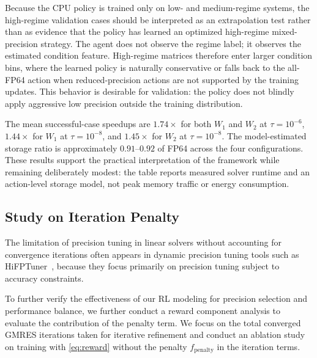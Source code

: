 \documentclass[Afour,sageh,times]{sagej}
\theoremstyle{plain}
\theoremstyle{definition}
\begin{document}
{Because the CPU policy is trained only on low- and medium-regime systems, the high-regime validation cases should be interpreted as an extrapolation test rather than as evidence that the policy has learned an optimized high-regime mixed-precision strategy. The agent does not observe the regime label; it observes the estimated condition feature. High-regime matrices therefore enter larger condition bins, where the learned policy is naturally conservative or falls back to the all-FP64 action when reduced-precision actions are not supported by the training updates. This behavior is desirable for validation: the policy does not blindly apply aggressive low precision outside the training distribution.

The mean successful-case speedups are $1.74\times$ for both $W_1$ and $W_2$ at $\tau=10^{-6}$, $1.44\times$ for $W_1$ at $\tau=10^{-8}$, and $1.45\times$ for $W_2$ at $\tau=10^{-8}$. The model-estimated storage ratio is approximately $0.91$--$0.92$ of FP64 across the four configurations. These results support the practical interpretation of the framework while remaining deliberately modest: the table reports measured solver runtime and an action-level storage model, not peak memory traffic or energy consumption.
}




\subsection{Study on Iteration Penalty}


The limitation of precision tuning in linear solvers without accounting for convergence iterations often appears in dynamic precision tuning tools such as HiFPTuner~\citep{10.1145/3213846.3213862}, because they focus primarily on precision tuning subject to accuracy constraints.

To further verify the effectiveness of our RL modeling for precision selection and performance balance,  we further conduct a reward component analysis to evaluate the contribution of the penalty term. We focus on the total converged GMRES iterations taken for iterative refinement and conduct an ablation study on training with \eqref{eq:reward} without the penalty $f_{\text{penalty}}$ in the iteration terms.
\end{document}
